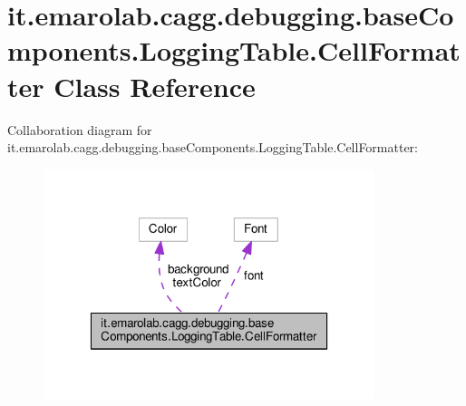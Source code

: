 \hypertarget{classit_1_1emarolab_1_1cagg_1_1debugging_1_1baseComponents_1_1LoggingTable_1_1CellFormatter}{\section{it.\-emarolab.\-cagg.\-debugging.\-base\-Components.\-Logging\-Table.\-Cell\-Formatter Class Reference}
\label{classit_1_1emarolab_1_1cagg_1_1debugging_1_1baseComponents_1_1LoggingTable_1_1CellFormatter}
}


Collaboration diagram for it.\-emarolab.\-cagg.\-debugging.\-base\-Components.\-Logging\-Table.\-Cell\-Formatter\-:\nopagebreak
\begin{figure}[H]
\begin{center}
\leavevmode
\includegraphics[width=274pt]{classit_1_1emarolab_1_1cagg_1_1debugging_1_1baseComponents_1_1LoggingTable_1_1CellFormatter__coll__graph}
\end{center}
\end{figure}
